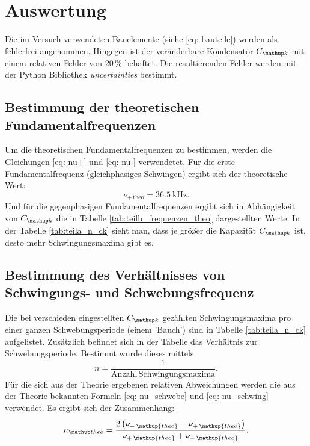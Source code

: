 \section{Auswertung}
Die im Versuch verwendeten Bauelemente (siehe \eqref{eq: bauteile})
werden als fehlerfrei angenommen.
Hingegen ist der veränderbare Kondensator $C\ua{k}$ mit
einem relativen Fehler von $20\,\%$ behaftet.
Die resultierenden Fehler werden mit der Python Bibliothek
\emph{uncertainties} bestimmt.

\subsection{Bestimmung der theoretischen Fundamentalfrequenzen}
Um die theoretischen Fundamentalfrequenzen zu bestimmen, werden die Gleichungen \eqref{eq: nu+} und
\eqref{eq: nu-} verwendetet.
Für die erste Fundamentalfrequenz (gleichphasiges Schwingen) ergibt sich der
theoretische Wert: %
\begin{equation}
\label{eq:nu_plu_theo}
\nu_{+\,\mathup{theo}}=\SI{36,5}{\kilo\hertz}.
\end{equation}
Und für die gegenphasigen Fundamentalfrequenzen ergibt sich in Abhängigkeit von $C\ua{k}$ die in Tabelle \ref{tab:teilb_frequenzen_theo}  dargestellten Werte. %
In der Tabelle \ref{tab:teila_n_ck} sieht man, dass je größer die Kapazität $C\ua{k}$ ist, desto
mehr Schwingungsmaxima gibt es.


\subsection{Bestimmung des Verhältnisses von Schwingungs- und Schwebungsfrequenz}
Die bei verschieden eingestellten $C\ua{k}$ gezählten Schwingungsmaxima pro einer ganzen %
Schwebungsperiode (einem 'Bauch') sind in Tabelle \ref{tab:teila_n_ck} aufgelistet. %
Zusätzlich befindet sich in der Tabelle das Verhältnis zur Schwebungsperiode. %
Bestimmt wurde dieses mittels %
\begin{equation*}
n=\frac{1}{\mathup{Anzahl \, Schwingungsmaxima}}.
\end{equation*}
Für die sich aus der Theorie ergebenen relativen Abweichungen werden die aus der Theorie
bekannten Formeln \eqref{eq: nu_schwebe} und \eqref{eq: nu_schwing} verwendet.
Es ergibt sich der Zusammenhang:
\begin{equation*}
n\ua{theo}=\frac{2\left(\nu_{-\,\mathup{theo}}-\nu_{+\,\mathup{theo}}\right)}{\nu_{+\,\mathup{theo}}+\nu_{-\,\mathup{theo}}}.
\end{equation*}


